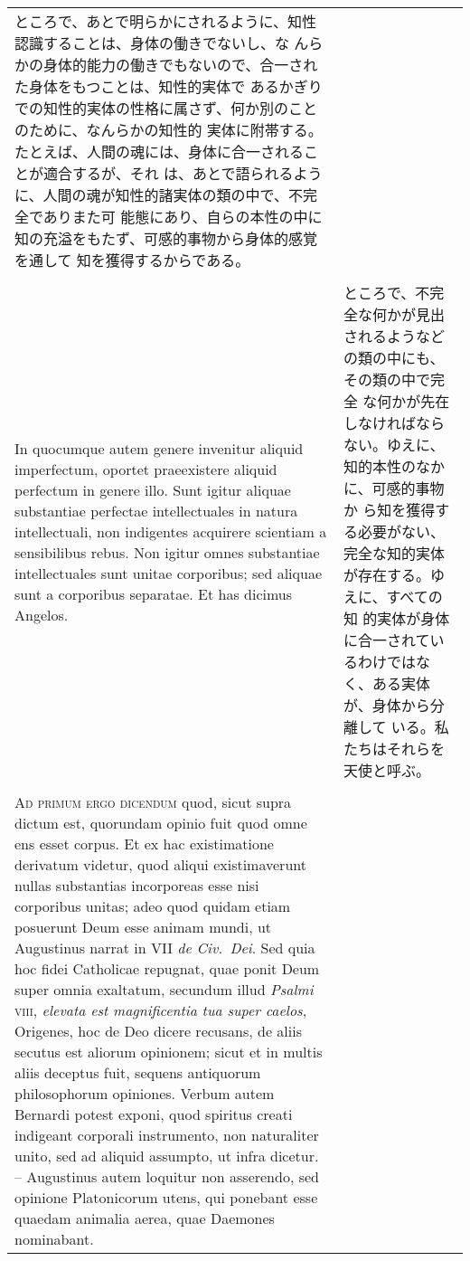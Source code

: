 \documentclass[10pt]{jsarticle} %
\begin{document}
\begin{longtable}{p{21em}p{21em}}
ところで、あとで明らかにされるように、知性認識することは、身体の働きでないし、な
 んらかの身体的能力の働きでもないので、合一された身体をもつことは、知性的実体で
 あるかぎりでの知性的実体の性格に属さず、何か別のことのために、なんらかの知性的
 実体に附帯する。たとえば、人間の魂には、身体に合一されることが適合するが、それ
 は、あとで語られるように、人間の魂が知性的諸実体の類の中で、不完全でありまた可
 能態にあり、自らの本性の中に知の充溢をもたず、可感的事物から身体的感覚を通して
 知を獲得するからである。


\\\\



In quocumque autem genere invenitur aliquid
imperfectum, oportet praeexistere aliquid perfectum in genere illo. Sunt
igitur aliquae substantiae perfectae intellectuales in natura
intellectuali, non indigentes acquirere scientiam a sensibilibus
rebus. Non igitur omnes substantiae intellectuales sunt unitae
corporibus; sed aliquae sunt a corporibus separatae. Et has dicimus
Angelos.


&

ところで、不完全な何かが見出されるようなどの類の中にも、その類の中で完全
 な何かが先在しなければならない。ゆえに、知的本性のなかに、可感的事物か
 ら知を獲得する必要がない、完全な知的実体が存在する。ゆえに、すべての知
 的実体が身体に合一されているわけではなく、ある実体が、身体から分離して
 いる。私たちはそれらを天使と呼ぶ。

\\\\


{\scshape Ad primum ergo dicendum} quod, sicut supra dictum est,
quorundam opinio fuit quod omne ens esset corpus. Et ex hac
existimatione derivatum videtur, quod aliqui existimaverunt nullas
substantias incorporeas esse nisi corporibus unitas; adeo quod quidam
etiam posuerunt Deum esse animam mundi, ut Augustinus narrat in VII
{\itshape de Civ.~Dei}. Sed quia hoc fidei Catholicae repugnat, quae
ponit Deum super omnia exaltatum, secundum illud {\itshape Psalmi}
{\scshape viii}, {\itshape elevata est magnificentia tua super caelos},
Origenes, hoc de Deo dicere recusans, de aliis secutus est aliorum
opinionem; sicut et in multis aliis deceptus fuit, sequens antiquorum
philosophorum opiniones. Verbum autem Bernardi potest exponi, quod
spiritus creati indigeant corporali instrumento, non naturaliter unito,
sed ad aliquid assumpto, ut infra dicetur. -- Augustinus autem loquitur non
asserendo, sed opinione Platonicorum utens, qui ponebant esse quaedam
animalia aerea, quae Daemones nominabant.



\end{longtable}
\end{document}
